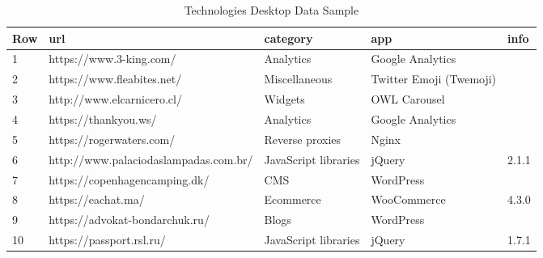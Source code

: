 \begin{enumerate}
\begin{table}[H]
	\centering
	\begin{tabular}{|l|l|p{3cm}|p{3cm}|l|}
		\hline
		\textbf{Row} & \textbf{url} & \textbf{category} & app & info\\
		\hline
		1 & https://www.3-king.com/ & Analytics & Google Analytics & \\
		\hline
		2 & https://www.fleabites.net/ & Miscellaneous & Twitter Emoji (Twemoji) & \\
		\hline
		3 & http://www.elcarnicero.cl/ & Widgets & OWL Carousel & \\
		\hline
		4 & https://thankyou.ws/ & Analytics & Google Analytics & \\
		\hline
		5 & https://rogerwaters.com/ & Reverse proxies & Nginx & \\
		\hline
		6 & http://www.palaciodaslampadas.com.br/ & JavaScript libraries & jQuery & 2.1.1\\
		\hline
		7 & https://copenhagencamping.dk/ & CMS & WordPress & \\
		\hline
		8 & https://eachat.ma/ & Ecommerce & WooCommerce & 4.3.0\\
		\hline
		9 & https://advokat-bondarchuk.ru/ & Blogs & WordPress & \\
		\hline
		10 & https://passport.rsl.ru/ & JavaScript libraries & jQuery & 1.7.1\\
		\hline
	\end{tabular}
	\caption{Technologies Desktop Data Sample}
	\label{table:ct_tech_desktop}
\end{table}


\end{enumerate}
